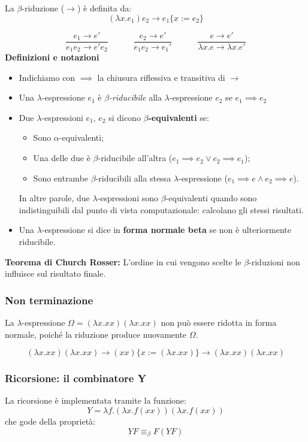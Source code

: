\documentclass[a4paper,10pt]{article}
\begin{document}
La $\beta$-riduzione ($\to$) è definita da:
 \[ (\lambda x.e_1)e_2 \to  e_1 \{ x:=e_2 \}\]
 
  \[ \dfrac{e_1 \to e'}{e_1e_2 \to e'e_2} \quad\quad\quad \dfrac{e_2 \to e'}{e_1e_2 \to e_1'} \quad\quad\quad \dfrac{e \to e'}{\lambda x.e \to \lambda x .e'}\]
\textbf{Definizioni e notazioni}

\begin{itemize}
 \item Indichiamo con $\implies$ la chiusura riflessiva e transitiva di $\to$
 \item Una $\lambda$-espressione $e_1$ è \emph{$\beta$-riducibile} alla $\lambda$-espressione $e_2$ se $e_1 \implies e_2$
 \item Due $\lambda$-espressioni $e_1$, $e_2$ si dicono $\beta$\textbf{-equivalenti} se:
 \begin{itemize}
  \item Sono $\alpha$-equivalenti;
  \item Una delle due è $\beta$-riducibile all'altra ($e_1 \implies e_2 \vee e_2 \implies e_1$);
  \item Sono entrambe $\beta$-riducibili alla stessa $\lambda$-espressione ($e_1 \implies e \wedge e_2 \implies e$).
 \end{itemize}
In altre parole, due $\lambda$-espressioni sono $\beta$-equivalenti quando sono indistinguibili dal punto di vista computazionale: calcolano gli stessi risultati.
\item Una $\lambda$-espressione si dice in \textbf{forma normale beta} se non è ulteriormente riducibile.
\end{itemize}

\textbf{Teorema di Church Rosser:} L'ordine in cui vengono scelte le $\beta$-riduzioni non influisce sul risultato finale.

\subsubsection{Non terminazione}
La $\lambda$-espressione $\Omega = (\lambda x . xx)(\lambda x . xx)$ non può essere ridotta in forma normale, poiché la riduzione produce nuovamente $\Omega$.

\[  (\lambda x . xx)(\lambda x . xx) \to (xx)\{ x := (\lambda x . xx) \} \to (\lambda x . xx)(\lambda x . xx) \]

\subsubsection{Ricorsione: il combinatore Y}
La ricorsione è implementata tramite la funzione:
\[ Y = \lambda f.(\lambda x.f(xx))(\lambda x.f(xx)) \]
che gode della proprietà:
\[ YF \equiv_\beta F(YF) \]
\end{document}
